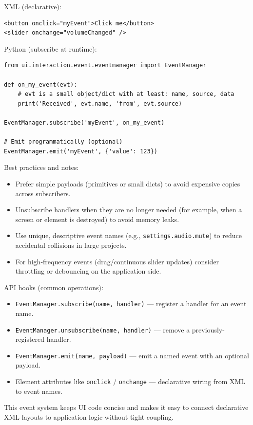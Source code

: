 \documentclass[a4paper,11pt]{article}
\begin{document}
XML (declarative):
\begin{verbatim}
<button onclick="myEvent">Click me</button>
<slider onchange="volumeChanged" />
\end{verbatim}

Python (subscribe at runtime):
\begin{verbatim}
from ui.interaction.event.eventmanager import EventManager

def on_my_event(evt):
    # evt is a small object/dict with at least: name, source, data
    print('Received', evt.name, 'from', evt.source)

EventManager.subscribe('myEvent', on_my_event)

# Emit programmatically (optional)
EventManager.emit('myEvent', {'value': 123})
\end{verbatim}

Best practices and notes:
\begin{itemize}
    \item Prefer simple payloads (primitives or small dicts) to avoid expensive copies across subscribers.
    \item Unsubscribe handlers when they are no longer needed (for example, when a screen or element is destroyed) to avoid memory leaks.
    \item Use unique, descriptive event names (e.g., \texttt{settings.audio.mute}) to reduce accidental collisions in large projects.
    \item For high-frequency events (drag/continuous slider updates) consider throttling or debouncing on the application side.
\end{itemize}

API hooks (common operations):
\begin{itemize}
    \item \texttt{EventManager.subscribe(name, handler)} — register a handler for an event name.
    \item \texttt{EventManager.unsubscribe(name, handler)} — remove a previously-registered handler.
    \item \texttt{EventManager.emit(name, payload)} — emit a named event with an optional payload.
    \item Element attributes like \texttt{onclick} / \texttt{onchange} — declarative wiring from XML to event names.
\end{itemize}

This event system keeps UI code concise and makes it easy to connect declarative XML layouts to application logic without tight coupling.
\end{document}
